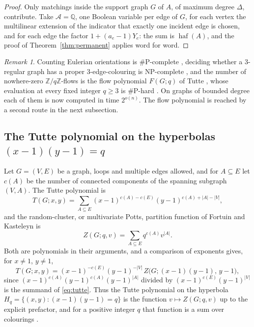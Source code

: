 \documentclass[11pt,reqno]{amsart}
\numberwithin{equation}{section}
\theoremstyle{plain}
\theoremstyle{definition}
\theoremstyle{remark}
\newtheorem{remark}[theorem]{Remark}
\newcommand{\A}{\mathcal{A}}
\newcommand{\Q}{\mathbb{Q}}
\newcommand{\Z}{\mathbb{Z}}
\begin{document}
\begin{proof}
Only matchings inside the support graph $G$ of $A$, of maximum degree $\Delta$,
contribute. Take $\A=\Q$, one Boolean variable per edge of $G$, for each vertex
the multilinear extension of the indicator that exactly one incident edge is
chosen, and for each edge the factor $1+(a_e-1)Y_e$: the sum is
$\operatorname{haf}(A)$, and the proof of Theorem~\ref{thm:permanent} applies
word for word.
\end{proof}

\begin{remark}
Counting Eulerian orientations is $\#$P-complete \cite{MW96}, deciding whether a
$3$-regular graph has a proper $3$-edge-colouring is NP-complete \cite{Hol81},
and the number of nowhere-zero $\Z/q\Z$-flows is the flow polynomial $F(G;q)$ of
Tutte \cite{Tut54}, whose evaluation at every fixed integer $q\ge3$ is
$\#$P-hard \cite{JVW90}. On graphs of bounded degree each of them is now
computed in time $2^{o(n)}$. The flow polynomial is reached by a second route in
the next subsection.
\end{remark}

\subsection{The Tutte polynomial on the hyperbolas $(x-1)(y-1)=q$}\label{ssec:tutte}
Let $G=(V,E)$ be a graph, loops and multiple edges allowed, and for $A\subseteq E$
let $c(A)$ be the number of connected components of the spanning subgraph
$(V,A)$. The Tutte polynomial is
\begin{equation}\label{eq:tutte}
  T(G;x,y)=\sum_{A\subseteq E}(x-1)^{c(A)-c(E)}(y-1)^{c(A)+|A|-|V|},
\end{equation}
and the random-cluster, or multivariate Potts, partition function of
Fortuin and Kasteleyn \cite{FK72} is
\begin{equation}\label{eq:rc}
  Z(G;q,v)=\sum_{A\subseteq E}q^{c(A)}v^{|A|}.
\end{equation}
Both are polynomials in their arguments, and a comparison of exponents gives,
for $x\ne1$, $y\ne1$,
\begin{equation}\label{eq:tutterc}
  T(G;x,y)=(x-1)^{-c(E)}(y-1)^{-|V|}\,Z\bigl(G;(x-1)(y-1),\,y-1\bigr),
\end{equation}
since $(x-1)^{c(A)}(y-1)^{c(A)}(y-1)^{|A|}$ divided by $(x-1)^{c(E)}(y-1)^{|V|}$
is the summand of \eqref{eq:tutte}. Thus the Tutte polynomial on the hyperbola
$H_q=\{(x,y):(x-1)(y-1)=q\}$ is the function $v\mapsto Z(G;q,v)$ up to the
explicit prefactor, and for a positive integer $q$ that function is a sum over
colourings \cite{FK72,Sok05}.
\end{document}
